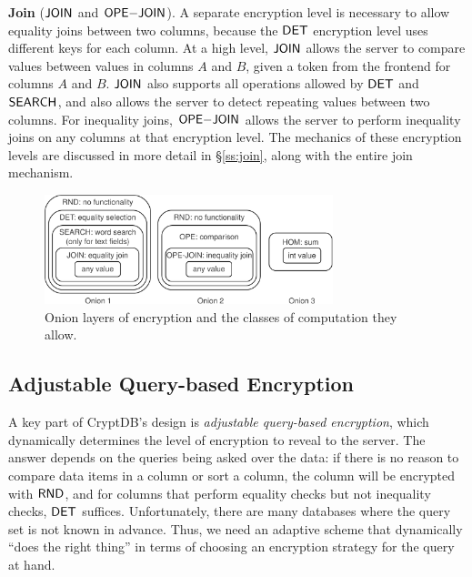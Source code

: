 \textbf{Join} ($\mathsf{JOIN}$ and $\mathsf{OPE}\mathrm{-}\mathsf{JOIN}$)\@. 
A separate encryption level is necessary to allow equality joins between
two columns, because the $\mathsf{DET}$ encryption level uses different keys for
each column.  At a high level, $\mathsf{JOIN}$ allows the server
to compare values between values in columns $A$ and $B$, given a token
from the frontend for columns $A$ and $B$\@.  $\mathsf{JOIN}$ also
supports all operations allowed by $\mathsf{DET}$ and $\mathsf{SEARCH}$, and also allows
the server to detect repeating values between two columns.
For inequality joins, $\mathsf{OPE}\mathrm{-}\mathsf{JOIN}$ allows the server to perform inequality
joins on any columns at that encryption level.
The mechanics of these encryption levels are discussed in more detail
in \S\ref{ss:join}, along with the entire join mechanism.



\begin{figure}[t!] \centering \includegraphics[width=3.3in]{fig/storage.pdf}
\caption{Onion layers of encryption and the classes of computation they allow.}
\label{fig:onion}
\end{figure}

\subsection{Adjustable Query-based Encryption}

A key part of CryptDB's design is \textit{adjustable query-based encryption},
which dynamically determines the level of encryption to reveal to the server.
The answer depends on the queries being asked over the data:
if there is no reason to compare data items in a column or sort a
column, the column will be encrypted with $\mathsf{RND}$, and for columns
that perform equality checks but not inequality checks, $\mathsf{DET}$ suffices.
Unfortunately, there are many databases where the query set
is not known in advance.
Thus, we need an adaptive scheme that dynamically ``does the right thing''
in terms of choosing an encryption strategy for the query at hand.

